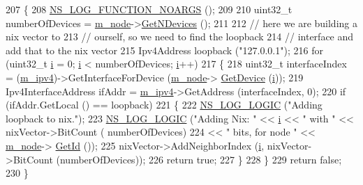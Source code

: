 \begin{DoxyCode}
207 \{
208   \hyperlink{log-macros-disabled_8h_a8f7e4afc291c9d29a65c18ac1f79197b}{NS\_LOG\_FUNCTION\_NOARGS} ();
209 
210   uint32\_t numberOfDevices = \hyperlink{classns3_1_1Ipv4NixVectorRouting_a329265b09f4d85bac6ec9bd0ec2daa92}{m\_node}->\hyperlink{classns3_1_1Node_a531554d2241ba4fa1cd74e3360be6bce}{GetNDevices} ();
211 
212   \textcolor{comment}{// here we are building a nix vector to }
213   \textcolor{comment}{// ourself, so we need to find the loopback }
214   \textcolor{comment}{// interface and add that to the nix vector}
215   Ipv4Address loopback (\textcolor{stringliteral}{"127.0.0.1"});
216   \textcolor{keywordflow}{for} (uint32\_t \hyperlink{bernuolliDistribution_8m_a6f6ccfcf58b31cb6412107d9d5281426}{i} = 0; \hyperlink{bernuolliDistribution_8m_a6f6ccfcf58b31cb6412107d9d5281426}{i} < numberOfDevices; \hyperlink{bernuolliDistribution_8m_a6f6ccfcf58b31cb6412107d9d5281426}{i}++)
217     \{
218       uint32\_t interfaceIndex = (\hyperlink{classns3_1_1Ipv4NixVectorRouting_a215cb71f30d85df9ec7176ca22620519}{m\_ipv4})->GetInterfaceForDevice (\hyperlink{classns3_1_1Ipv4NixVectorRouting_a329265b09f4d85bac6ec9bd0ec2daa92}{m\_node}->
      \hyperlink{classns3_1_1Node_a5918dfd24ef632efc9a83a5f6561c76e}{GetDevice} (\hyperlink{bernuolliDistribution_8m_a6f6ccfcf58b31cb6412107d9d5281426}{i}));
219       Ipv4InterfaceAddress ifAddr = \hyperlink{classns3_1_1Ipv4NixVectorRouting_a215cb71f30d85df9ec7176ca22620519}{m\_ipv4}->GetAddress (interfaceIndex, 0);
220       \textcolor{keywordflow}{if} (ifAddr.GetLocal () == loopback)
221         \{
222           \hyperlink{group__logging_ga88acd260151caf2db9c0fc84997f45ce}{NS\_LOG\_LOGIC} (\textcolor{stringliteral}{"Adding loopback to nix."});
223           \hyperlink{group__logging_ga88acd260151caf2db9c0fc84997f45ce}{NS\_LOG\_LOGIC} (\textcolor{stringliteral}{"Adding Nix: "} << \hyperlink{bernuolliDistribution_8m_a6f6ccfcf58b31cb6412107d9d5281426}{i} << \textcolor{stringliteral}{" with "} << nixVector->BitCount (
      numberOfDevices) 
224                                        << \textcolor{stringliteral}{" bits, for node "} << \hyperlink{classns3_1_1Ipv4NixVectorRouting_a329265b09f4d85bac6ec9bd0ec2daa92}{m\_node}->
      \hyperlink{classns3_1_1Node_aaf49b64a843565ce3812326313b370ac}{GetId} ());
225           nixVector->AddNeighborIndex (\hyperlink{bernuolliDistribution_8m_a6f6ccfcf58b31cb6412107d9d5281426}{i}, nixVector->BitCount (numberOfDevices));
226           \textcolor{keywordflow}{return} \textcolor{keyword}{true};
227         \}
228     \}
229   \textcolor{keywordflow}{return} \textcolor{keyword}{false};
230 \}
\end{DoxyCode}


